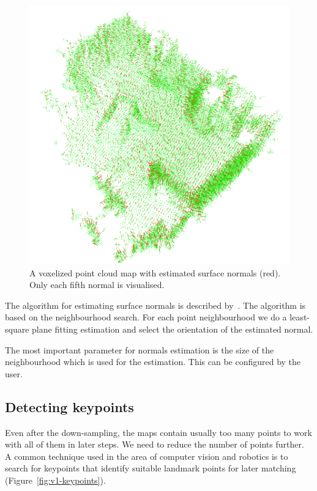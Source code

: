 \begin{figure}
    \centering
    \includegraphics[width=\textwidth]{../img/v1-normals.png}
    \caption[A point cloud map with estimated surface normals]{A voxelized point cloud map with estimated surface normals (red). Only each fifth normal is visualised.}
    \label{fig:v1-normals}
\end{figure}

The algorithm for estimating surface normals is described by~\citet{RusuDoctoralDissertation}. The algorithm is based on the neighbourhood search. For each point neighbourhood we do a least-square plane fitting estimation and select the orientation of the estimated normal.

The most important parameter for normals estimation is the size of the neighbourhood which is used for the estimation. This can be configured by the user.

\subsection{Detecting keypoints}
\label{sec:detect-keypoints}

Even after the down-sampling, the maps contain usually too many points to work with all of them in later steps. We need to reduce the number of points further. A common technique used in the area of computer vision and robotics is to search for keypoints that identify suitable landmark points for later matching (Figure~\ref{fig:v1-keypoints}).

